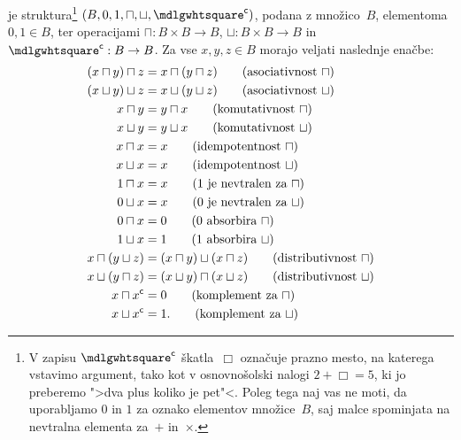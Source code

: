 \begin{definicija}
  \label{def:boolova-algebra}
   je struktura\footnote{V zapisu $\compl{\Box}$ škatla~$\Box$ označuje prazno mesto, na katerega vstavimo argument, tako kot v osnovnošolski nalogi $2 + \Box = 5$, ki jo preberemo ">dva plus koliko je pet"<. Poleg tega naj vas ne moti, da uporabljamo $0$ in $1$ za oznako elementov množice~$B$, saj malce spominjata na nevtralna elementa za~$+$ in~$\times$.} $(B, 0, 1, \sqcap, \sqcup, \compl{\Box})$, podana z množico~$B$, elementoma $0, 1 \in B$, ter operacijami  $\sqcap : B \times B \to B$,  $\sqcup : B \times B \to B$ in  $\compl{\Box} : B \to B$.
  Za vse $x, y, z \in B$ morajo veljati naslednje enačbe:
  \begin{align}
    (x \sqcap y) \sqcap z &= x \sqcap (y \sqcap z) \tag{asociativnost $\sqcap$} \\
    (x \sqcup y) \sqcup z &= x \sqcup (y \sqcup z) \tag{asociativnost $\sqcup$} \\
    x \sqcap y &= y \sqcap x \tag{komutativnost $\sqcap$} \\
    x \sqcup y &= y \sqcup x \tag{komutativnost $\sqcup$} \\
    x \sqcap x &= x \tag{idempotentnost $\sqcap$} \\
    x \sqcup x &= x \tag{idempotentnost $\sqcup$} \\
    1 \sqcap x &= x \tag{$1$ je nevtralen za $\sqcap$} \\
    0 \sqcup x &= x \tag{$0$ je nevtralen za $\sqcup$} \\
    0 \sqcap x &= 0 \tag{$0$ absorbira $\sqcap$} \\
    1 \sqcup x &= 1 \tag{$1$ absorbira $\sqcup$} \\
    x \sqcap (y \sqcup z) &= (x \sqcap y) \sqcup (x \sqcap z) \tag{distributivnost $\sqcap$} \\
    x \sqcup (y \sqcap z) &= (x \sqcup y) \sqcap (x \sqcup z) \tag{distributivnost $\sqcup$} \\
    x \sqcap x^{\mathsf{c}} &= 0 \tag{komplement za $\sqcap$} \\
    x \sqcup x^{\mathsf{c}} &= 1. \tag{komplement za $\sqcup$}
  \end{align}
\end{definicija}

